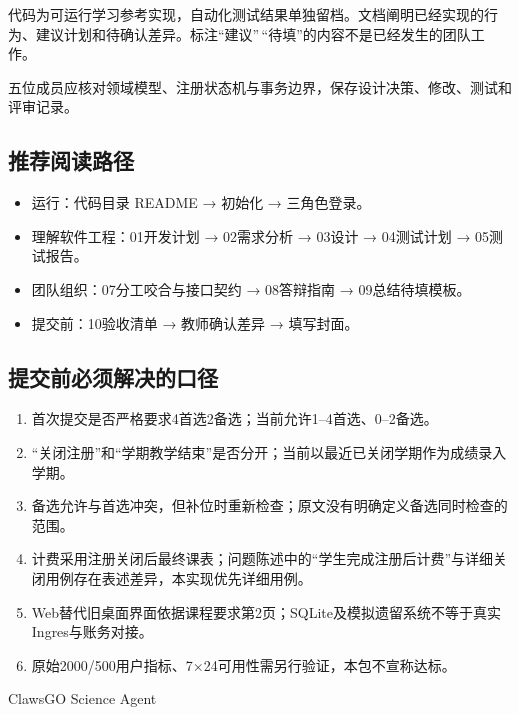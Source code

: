 \documentclass[UTF8,11pt,a4paper]{ctexart}
\providecommand{\tightlist}{\setlength{\itemsep}{0pt}\setlength{\parskip}{0pt}}
\begin{document}
代码为可运行学习参考实现，自动化测试结果单独留档。文档阐明已经实现的行为、建议计划和待确认差异。标注``建议''\,``待填''的内容不是已经发生的团队工作。

五位成员应核对领域模型、注册状态机与事务边界，保存设计决策、修改、测试和评审记录。

\hypertarget{ux63a8ux8350ux9605ux8bfbux8defux5f84}{%
\subsection{推荐阅读路径}\label{ux63a8ux8350ux9605ux8bfbux8defux5f84}}

\begin{itemize}
\tightlist
\item
  运行：代码目录 README → 初始化 → 三角色登录。
\item
  理解软件工程：01开发计划 → 02需求分析 → 03设计 → 04测试计划 →
  05测试报告。
\item
  团队组织：07分工咬合与接口契约 → 08答辩指南 → 09总结待填模板。
\item
  提交前：10验收清单 → 教师确认差异 → 填写封面。
\end{itemize}

\hypertarget{ux63d0ux4ea4ux524dux5fc5ux987bux89e3ux51b3ux7684ux53e3ux5f84}{%
\subsection{提交前必须解决的口径}\label{ux63d0ux4ea4ux524dux5fc5ux987bux89e3ux51b3ux7684ux53e3ux5f84}}

\begin{enumerate}
\def\labelenumi{\arabic{enumi}.}
\tightlist
\item
  首次提交是否严格要求4首选2备选；当前允许1--4首选、0--2备选。
\item
  ``关闭注册''和``学期教学结束''是否分开；当前以最近已关闭学期作为成绩录入学期。
\item
  备选允许与首选冲突，但补位时重新检查；原文没有明确定义备选同时检查的范围。
\item
  计费采用注册关闭后最终课表；问题陈述中的``学生完成注册后计费''与详细关闭用例存在表述差异，本实现优先详细用例。
\item
  Web替代旧桌面界面依据课程要求第2页；SQLite及模拟遗留系统不等于真实Ingres与账务对接。
\item
  原始2000/500用户指标、7×24可用性需另行验证，本包不宣称达标。
\end{enumerate}

ClawsGO Science Agent
\end{document}
